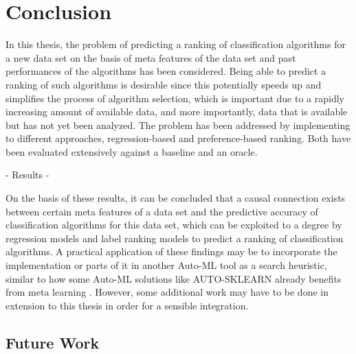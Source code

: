 \chapter{Conclusion}
\label{sec:conclusion}
In this thesis, the problem of predicting a ranking of classification algorithms for a new data set on the basis of meta features of the data set and past performances of the algorithms has been considered. Being able to predict a ranking of such algorithms is desirable since this potentially speeds up and simplifies the process of algorithm selection, which is important due to a rapidly increasing amount of available data, and more importantly, data that is available but has not yet been analyzed. The problem has been addressed by implementing to different approaches, regression-based and preference-based ranking. Both have been evaluated extensively against a baseline and an oracle.

- Results - 

On the basis of these results, it can be concluded that a causal connection exists between certain meta features of a data set and the predictive accuracy of classification algorithms for this data set, which can be exploited to a degree by regression models and label ranking models to predict a ranking of classification algorithms. A practical application of these findings may be to incorporate the implementation or parts of it in another Auto-ML tool as a search heuristic, similar to how some Auto-ML solutions like AUTO-SKLEARN already benefits from meta learning \cite{feurer2015efficient}. However, some additional work may have to be done in extension to this thesis in order for a sensible integration.

\section{Future Work}
\label{sec:conclusion:future}






